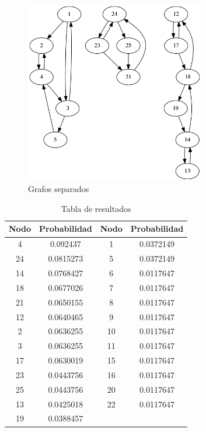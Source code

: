 \begin{figure}[H]
	\centering
	\includegraphics[width=0.7\textwidth]{img/links_grafos_separados_25.png}
	\caption{Grafos separados}
	\label{fig: Grafos separados}
\end{figure}

\begin{table}[H]
\centering
	\begin{tabular}{|c|c|c|c|}
		\hline
		Nodo & Probabilidad & Nodo & Probabilidad \\ \hline
		4    & 0.092437     & 1    & 0.0372149    \\
		24   & 0.0815273    & 5    & 0.0372149    \\
		14   & 0.0768427    & 6    & 0.0117647    \\
		18   & 0.0677026    & 7    & 0.0117647    \\
		21   & 0.0650155    & 8    & 0.0117647    \\
		12   & 0.0640465    & 9    & 0.0117647    \\
		2    & 0.0636255    & 10   & 0.0117647    \\
		3    & 0.0636255    & 11   & 0.0117647    \\
		17   & 0.0630019    & 15   & 0.0117647    \\
		23   & 0.0443756    & 16   & 0.0117647    \\
		25   & 0.0443756    & 20   & 0.0117647    \\
		13   & 0.0425018    & 22   & 0.0117647    \\
		19   & 0.0388457    & ~    & ~            \\ \hline
	\end{tabular}
\caption {Tabla de resultados}
\end{table}

